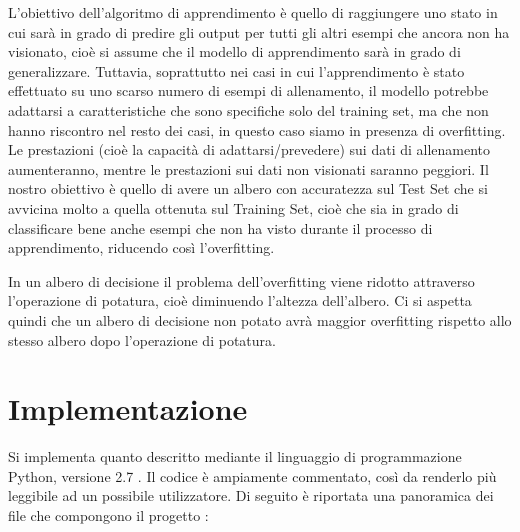 \documentclass[]{article}
\begin{document}
L'obiettivo dell'algoritmo di apprendimento è quello di raggiungere uno stato in cui sarà in grado di predire gli output per tutti gli altri esempi che ancora non ha visionato, cioè si assume che il modello di apprendimento sarà in grado di generalizzare. Tuttavia, soprattutto nei casi in cui l'apprendimento è stato effettuato su uno scarso numero di esempi di allenamento, il modello potrebbe adattarsi a caratteristiche che sono specifiche solo del training set, ma che non hanno riscontro nel resto dei casi, in questo caso siamo in presenza di overfitting. Le prestazioni (cioè la capacità di adattarsi/prevedere) sui dati di allenamento aumenteranno, mentre le prestazioni sui dati non visionati saranno peggiori.
Il nostro obiettivo è quello di avere un albero con accuratezza sul Test Set che si avvicina molto a quella ottenuta sul Training Set, cioè che sia in grado di classificare bene anche esempi che non ha visto durante il processo di apprendimento, riducendo così l'overfitting.

In un albero di decisione il problema dell'overfitting viene ridotto attraverso l'operazione di potatura, cioè diminuendo l'altezza dell'albero.
Ci si aspetta quindi che un albero di decisione non potato avrà maggior overfitting rispetto allo stesso albero dopo l'operazione di potatura.


\section*{Implementazione}

Si implementa quanto descritto mediante il linguaggio di programmazione Python, versione 2.7 .
Il codice è ampiamente commentato, così da renderlo più leggibile ad un possibile utilizzatore. Di seguito è riportata una panoramica dei file che compongono il progetto :
\end{document}
